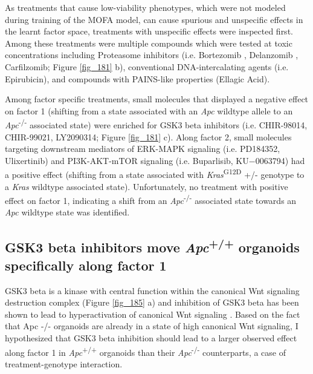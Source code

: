 \begin{flushleft}
As treatments that cause low-viability phenotypes, which were not modeled during training of the MOFA model, can cause spurious and unspecific effects in the learnt factor space, treatments with unspecific effects were inspected first. Among these treatments were multiple compounds which were tested at toxic concentrations including Proteasome inhibitors (i.e. Bortezomib , Delanzomib , Carfilzomib; Figure \ref{fig_181} b), conventional DNA-intercalating agents (i.e. Epirubicin), and compounds with PAINS-like properties (Ellagic Acid). 
\par

Among factor specific treatments, small molecules that displayed a negative effect on factor 1 (shifting from a state associated with an \textit{Apc} wildtype allele to an \textit{Apc}\textsuperscript{-/-}  associated state) were enriched for GSK3 beta inhibitors (i.e. CHIR-98014, CHIR-99021, LY2090314; Figure \ref{fig_181} c). Along factor 2, small molecules targeting downstream mediators of ERK-MAPK signaling (i.e.  PD184352, Ulixertinib) and PI3K-AKT-mTOR signaling (i.e. Buparlisib, KU−0063794) had a positive effect (shifting from a state associated with \textit{Kras}\textsuperscript{G12D} +/- genotype to a \textit{Kras} wildtype associated state). Unfortunately, no treatment with positive effect on factor 1, indicating a shift from an \textit{Apc}\textsuperscript{-/-}  associated state towards an \textit{Apc} wildtype state was identified. 

\clearpage
\subsection{GSK3 beta inhibitors move \textit{Apc}\textsuperscript{+/+} organoids specifically along factor 1}

GSK3 beta is a kinase with central function within the canonical Wnt signaling destruction complex \parencite{stamosVCateninDestructionComplex2013} (Figure \ref{fig_185} a) and inhibition of GSK3 beta has been shown to lead to hyperactivation of canonical Wnt signaling \parencite{stambolicLithiumInhibitsGlycogen1996}. Based on the fact that Apc -/- organoids are already in a state of high canonical Wnt signaling, I hypothesized that GSK3 beta inhibition should lead to a larger observed effect along factor 1 in \textit{Apc}\textsuperscript{+/+} organoids than their \textit{Apc}\textsuperscript{-/-}  counterparts, a case of treatment-genotype interaction. 


\end{flushleft}
